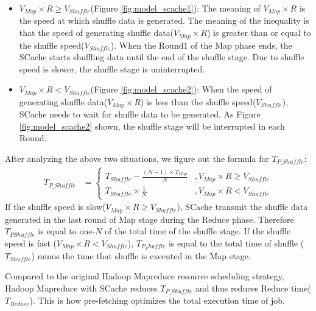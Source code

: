 {\begin{itemize}
    \item 
    \(V_{Map} \times R \ge V_{Shuffle}\)(Figure \ref{fig:model_scache1}): 
    The meaning of \(V_{Map} \times R\) is the speed at which shuffle data is generated. The meaning of the inequality is that the speed of generating shuffle data(\(V_{Map} \times R\)) is greater than or equal to the shuffle speed(\(V_{Shuffle}\)). When the Round1 of the Map phase ends, the SCache starts shuffling data until the end of the shuffle stage. Due to shuffle speed is slower, the shuffle stage is uninterrupted.
    \item \(V_{Map} \times R < V_{Shuffle}\)(Figure \ref{fig:model_scache2}): 
    When the speed of generating shuffle data(\(V_{Map} \times R\)) is less than the shuffle speed(\(V_{Shuffle}\)), SCache needs to wait for shuffle data to be generated. As Figure \ref{fig:model_scache2} shown, the shuffle stage will be interrupted in each Round.
\end{itemize}

After analyzing the above two situations, we figure out the formula for \(T_{P\_Shuffle}\):
\begin{equation}
    \label{equation_Tpshuffle}
    \begin{aligned}
    T_{P\_Shuffle} &=
        \begin{cases} 
        T_{Shuffle} - \frac{(N - 1)\times T_{Map}}{N} & , V_{Map} \times R \ge V_{Shuffle} \\ 
        T_{Shuffle} \times \frac{1}{N} & , V_{Map} \times R < V_{Shuffle}
        \end{cases}
    \end{aligned}
\end{equation}
If the shuffle speed is slow(\(V_{Map} \times R \ge V_{Shuffle}\)), SCache transmit the shuffle data generated in the last round of Map stage during the Reduce phase. Therefore \(T_{PShuffle}\) is equal to one-\(N\) of the total time of the shuffle stage. If the shuffle speed is fast (\(V_{Map} \times R < V_{Shuffle}\)), \(T_{P_Shuffle}\) is equal to the total time of shuffle (\(T_{Shuffle}\)) minus the time that shuffle is executed in the Map stage.

Compared to the original Hadoop Mapreduce resource scheduling strategy, Hadoop Mapreduce with SCache reduces \(T_{P\_Shuffle}\) and thus reduces Reduce time(\(T_{Reduce}\)). This is how pre-fetching optimizes the total execution time of job.

}
